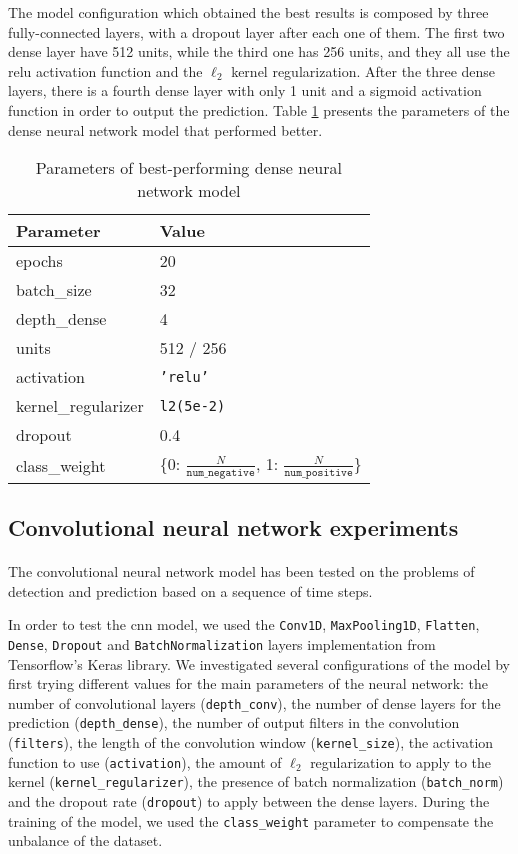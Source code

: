 The model configuration which obtained the best results is composed by three fully-connected layers, with a dropout layer after each one of them. The first two dense layer have 512 units, while the third one has 256 units, and they all use the \acs{relu} activation function and the $\ell_2$ kernel regularization. After the three dense layers, there is a fourth dense layer with only 1 unit and a sigmoid activation function in order to output the prediction. Table \ref{tab:dense_param} presents the parameters of the dense neural network model that performed better.
\begin{table}[htbp]
    \centering
    \begin{tabular}{ll}
        \hline
        \textbf{Parameter}  & \textbf{Value} \\\hline
        epochs              & 20 \\
        batch\_size         & 32 \\
        depth\_dense        & 4 \\
        units               & 512 / 256 \\
        activation          & \texttt{'relu'} \\
        kernel\_regularizer & \texttt{l2(5e-2)} \\
        dropout             & 0.4 \\
        class\_weight       & \{0: $\frac{N}{\texttt{num\_negative}}$, 1: $\frac{N}{\texttt{num\_positive}}$\}
    \end{tabular}
    \caption{Parameters of best-performing dense neural network model}
    \label{tab:dense_param}
\end{table}

\subsection{Convolutional neural network experiments}
\paragraph{} The convolutional neural network model has been tested on the problems of detection and prediction based on a sequence of time steps.

In order to test the \acs{cnn} model, we used the \texttt{Conv1D}, \texttt{MaxPooling1D}, \texttt{Flatten}, \texttt{Dense}, \texttt{Dropout} and \texttt{BatchNormalization} layers implementation from Tensorflow's Keras library. We investigated several configurations of the model by first trying different values for the main parameters of the neural network: the number of convolutional layers (\texttt{depth\_conv}), the number of dense layers for the prediction (\texttt{depth\_dense}), the number of output filters in the convolution (\texttt{filters}), the length of the convolution window (\texttt{kernel\_size}), the activation function to use (\texttt{activation}), the amount of $\ell_2$ regularization to apply to the kernel (\texttt{kernel\_regularizer}), the presence of batch normalization (\texttt{batch\_norm}) and the dropout rate (\texttt{dropout}) to apply between the dense layers. During the training of the model, we used the \texttt{class\_weight} parameter to compensate the unbalance of the dataset.

